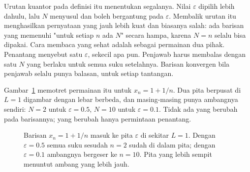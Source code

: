 Urutan kuantor pada definisi itu menentukan segalanya. Nilai $\varepsilon$ dipilih
lebih dahulu, lalu $N$ menyusul dan boleh bergantung pada $\varepsilon$. Membalik
urutan itu menghasilkan pernyataan yang jauh lebih kuat dan biasanya salah: ada
barisan yang memenuhi "untuk setiap $n$ ada $N$" secara hampa, karena $N=n$ selalu
bisa dipakai. Cara membaca yang sehat adalah sebagai permainan dua pihak. Penantang
menyebut satu $\varepsilon$, sekecil apa pun. Penjawab harus membalas dengan satu
$N$ yang berlaku untuk semua suku setelahnya. Barisan konvergen bila penjawab
selalu punya balasan, untuk setiap tantangan.

Gambar~\ref{fig:pita-epsilon} memotret permainan itu untuk $x_n=1+1/n$. Dua pita
berpusat di $L=1$ digambar dengan lebar berbeda, dan masing-masing punya ambangnya
sendiri: $N=2$ untuk $\varepsilon=0.5$, $N=10$ untuk $\varepsilon=0.1$. Tidak ada
yang berubah pada barisannya; yang berubah hanya permintaan penantang.

\begin{figure}[htbp]
\centering
{}
\caption{Barisan $x_n=1+1/n$ masuk ke pita $\varepsilon$ di sekitar $L=1$. Dengan
$\varepsilon=0.5$ semua suku sesudah $n=2$ sudah di dalam pita; dengan
$\varepsilon=0.1$ ambangnya bergeser ke $n=10$. Pita yang lebih sempit menuntut
ambang yang lebih jauh.}
\label{fig:pita-epsilon}
\end{figure}

